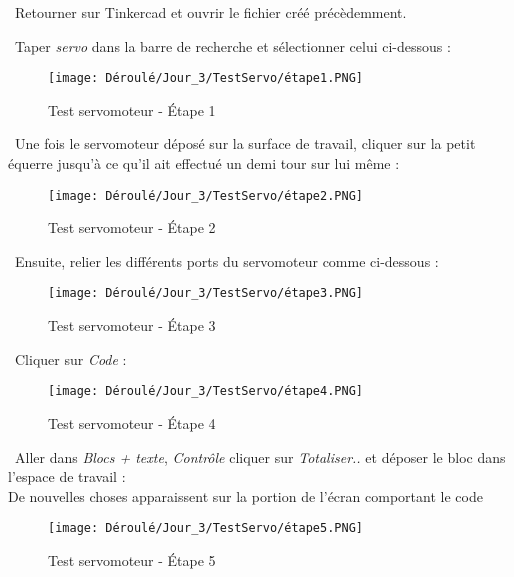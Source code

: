 \begin{flushleft}
\textbullet \, Retourner sur Tinkercad et ouvrir le fichier créé précèdemment.\vspace{0.2cm}

\textbullet \, Taper \textit{servo} dans la barre de recherche et sélectionner celui ci-dessous :
\begin{figure}[!h]
    \centering
    \texttt{[image: Déroulé/Jour\_3/TestServo/étape1.PNG]}
    \caption{Test servomoteur - \'Etape 1}
    \label{fig:my_label}
\end{figure}

\newpage

\textbullet \, Une fois le servomoteur déposé sur la surface de travail, cliquer sur la petit équerre jusqu'à ce qu'il ait effectué un demi tour sur lui même :
\begin{figure}[!h]
    \centering
    \texttt{[image: Déroulé/Jour\_3/TestServo/étape2.PNG]}
    \caption[\'Etape 2]{Test servomoteur - \'Etape 2}
    \label{fig:my_label}
\end{figure}

\textbullet \, Ensuite, relier les différents ports du servomoteur comme ci-dessous :
\begin{figure}[!h]
    \centering
    \texttt{[image: Déroulé/Jour\_3/TestServo/étape3.PNG]}
    \caption[\'Etape 3]{Test servomoteur - \'Etape 3}
    \label{3.18}
\end{figure}

\newpage

\textbullet \, Cliquer sur \textit{Code} :
\begin{figure}[!h]
    \centering
    \texttt{[image: Déroulé/Jour\_3/TestServo/étape4.PNG]}
    \caption[\'Etape 4]{Test servomoteur - \'Etape 4}
    \label{fig:my_label}
\end{figure}

\textbullet \, Aller dans \textit{Blocs + texte}, \textit{Contrôle} cliquer sur \textit{Totaliser..} et déposer le bloc dans l'espace de travail :\\
De nouvelles choses apparaissent sur la portion de l'écran comportant le code
\begin{figure}[!h]
    \centering
    \texttt{[image: Déroulé/Jour\_3/TestServo/étape5.PNG]}
    \caption[\'Etape 5]{Test servomoteur - \'Etape 5}
    \label{fig:my_label}
\end{figure}

\newpage


\end{flushleft}
